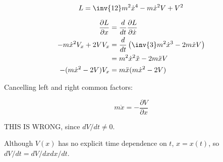 \documentclass{article}      %
\newcommand{\xdot}[0]{\dot{x}}
\newcommand{\xddot}[0]{\ddot{x}}
\begin{document}


\begin{equation*}
L = \inv{12}m^2 \xdot^4 - m \xdot^2 V + V^2
\end{equation*}

\begin{align*}
\frac{\partial L}{\partial x} &= \frac{d}{dt} \frac{\partial L}{\partial \xdot} \\
-m \xdot^2 V_x + 2V V_x &= \frac{d}{dt} \left( \inv{3}m^2 \xdot^3 - 2 m \xdot V \right) \\
                        &= m^2 \xdot^2 \xddot - 2m \xddot V \\
-(m \xdot^2 -2V) V_x    &= m \xddot (m \xdot^2 - 2 V) \\
\end{align*}

Cancelling left and right common factors:

\begin{equation*}
m \xddot = -\frac{\partial V}{\partial x}
\end{equation*}

THIS IS WRONG, since $dV/dt \ne 0$.

Although $V(x)$ has no explicit time
dependence on $t$, $x = x(t)$, so $dV/dt = dV/dx dx/dt$.
\end{document}

